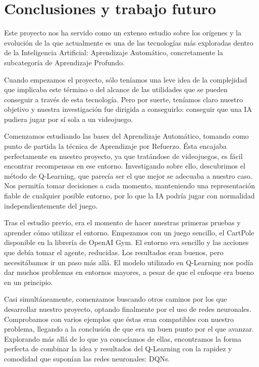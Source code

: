 \chapter{Conclusiones y trabajo futuro}
\label{cap:conclusiones}


Este proyecto nos ha servido como un extenso estudio sobre los orígenes y la evolución de la que actualmente es una de las tecnologías más exploradas dentro de la Inteligencia Artificial: Aprendizaje Automático, concretamente la subcategoría de Aprendizaje Profundo. 

Cuando empezamos el proyecto, sólo teníamos una leve idea de la complejidad que implicaba este término o del alcance de las utilidades que se pueden conseguir a través de esta tecnología. Pero por suerte, teníamos claro nuestro objetivo y nuestra investigación fue dirigida a conseguirlo: conseguir que una IA pudiera jugar por sí sola a un videojuego.

Comenzamos estudiando las bases del Aprendizaje Automático, tomando como punto de partida la técnica de Aprendizaje por Refuerzo. Ésta encajaba perfectamente en nuestro proyecto, ya que tratándose de videojuegos, es fácil encontrar recompensas en ese entorno. Investigando sobre ello, descubrimos el método de Q-Learning, que parecía ser el que mejor se adecuaba a nuestro caso. Nos permitía tomar decisiones a cada momento, manteniendo una representación fiable de cualquier posible entorno, por lo que la IA podría jugar con normalidad independientemente del juego.

Tras el estudio previo, era el momento de hacer nuestras primeras pruebas y aprender cómo utilizar el entorno. Empezamos con un juego sencillo, el CartPole disponible en la librería de OpenAI Gym. El entorno era sencillo y las acciones que debía tomar el agente, reducidas. Los resultados eran buenos, pero necesitábamos ir un paso más allá. El modelo utilizado en Q-Learning nos podía dar muchos problemas en entornos mayores, a pesar de que el enfoque era bueno en un principio.

Casi simultáneamente, comenzamos buscando otros caminos por los que desarrollar nuestro proyecto, optando finalmente por el uso de redes neuronales. Comprobamos con varios ejemplos que éstas eran compatibles con nuestro problema, llegando a la conclusión de que era un buen punto por el que avanzar. Explorando más allá de lo que ya conocíamos de ellas, encontramos la forma perfecta de combinar la idea y resultados del Q-Learning con la rapidez y comodidad que suponían las redes neuronales: DQNs. 

